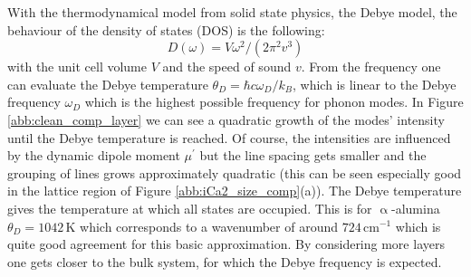 \documentclass[11pt,DIV=13,BCOR=5mm,a4paper,headinclude]{scrbook}
\begin{document}
With the thermodynamical model from solid state physics, the Debye model, the behaviour of the density of states (DOS) is the following\cite{kittel2002}:
\begin{equation}
 D(\omega)=V\omega^2/(2\pi^2v^3)
\end{equation}
with the unit cell volume $V$ and the speed of sound $v$.
From the frequency one can evaluate the Debye temperature $\theta_D=\hbar c \omega_D/k_B$, which is linear to the Debye frequency $\omega_D$ which is the highest possible frequency for phonon modes.
In Figure \ref{abb:clean_comp_layer} we can see a quadratic growth of the modes' intensity until the Debye temperature is reached.
Of course, the intensities are influenced by the dynamic dipole moment $\mu^\prime$ but the line spacing gets smaller and the grouping of lines grows approximately quadratic (this can be seen especially good in the lattice region of Figure \ref{abb:iCa2_size_comp}(a)).
The Debye temperature gives the temperature at which all states are occupied.
This is for $\upalpha$-alumina $\theta_D=1042\,$K which corresponds to a wavenumber of around $724\,$cm$^{-1}$\cite{Goto1989} which is quite good agreement for this basic approximation.
By considering more layers one gets closer to the bulk system, for which the Debye frequency is expected.
\end{document}
